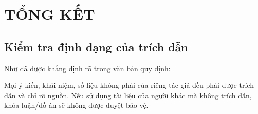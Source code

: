 \chapter{TỔNG KẾT}

\section{Kiểm tra định dạng của trích dẫn}

Như đã được khẳng định rõ trong văn bản quy định:
\begin{doantrichdan}
Mọi ý kiến, khái niệm, số liệu không phải của riêng tác giả đều phải được trích dẫn và chỉ rõ nguồn. Nếu sử dụng tài liệu của người khác mà không trích dẫn, khóa luận/đồ án sẽ không được duyệt bảo vệ.
\end{doantrichdan}
